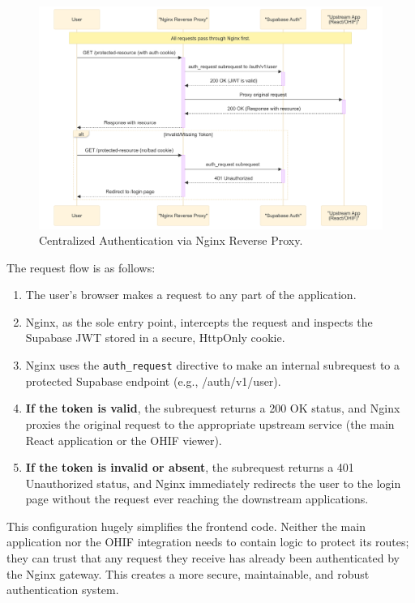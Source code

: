 \begin{figure}[H]
    \centering
    \includegraphics[width=\textwidth]{content/resources/images/chap4-system-design/Centralized Authentication via Nginx Reverse Proxy.png}
    \caption{Centralized Authentication via Nginx Reverse Proxy.}
    \label{fig:unified_auth}
\end{figure}

The request flow is as follows:
\begin{enumerate}
    \item The user's browser makes a request to any part of the application.
    \item Nginx, as the sole entry point, intercepts the request and inspects the Supabase JWT stored in a secure, HttpOnly cookie.
    \item Nginx uses the \texttt{auth\_request} directive to make an internal subrequest to a protected Supabase endpoint (e.g., /auth/v1/user).
    \item \textbf{If the token is valid}, the subrequest returns a 200 OK status, and Nginx proxies the original request to the appropriate upstream service (the main React application or the OHIF viewer).
    \item \textbf{If the token is invalid or absent}, the subrequest returns a 401 Unauthorized status, and Nginx immediately redirects the user to the login page without the request ever reaching the downstream applications.
\end{enumerate}

This configuration hugely simplifies the frontend code. Neither the main application nor the OHIF integration needs to contain logic to protect its routes; they can trust that any request they receive has already been authenticated by the Nginx gateway. This creates a more secure, maintainable, and robust authentication system.